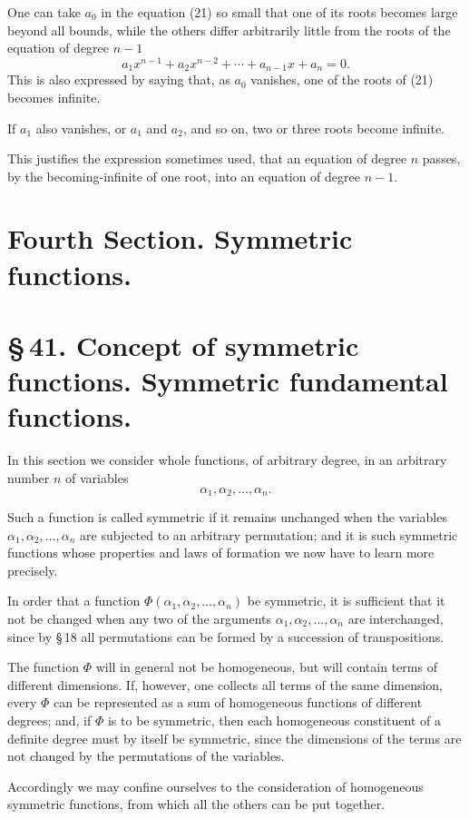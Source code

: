 \documentclass[11pt]{article}
\begin{document}
One can take $a_0$ in the equation (21) so small that one of its roots becomes large beyond all bounds, while the others differ arbitrarily little from the roots of the equation of degree $n-1$
\[
 a_1x^{n-1}+a_2x^{n-2}+\cdots+a_{n-1}x+a_n=0.
\]
This is also expressed by saying that, as $a_0$ vanishes, one of the roots of (21) becomes infinite.

If $a_1$ also vanishes, or $a_1$ and $a_2$, and so on, two or three roots become infinite.

This justifies the expression sometimes used, that an equation of degree $n$ passes, by the becoming-infinite of one root, into an equation of degree $n-1$.

\section*{Fourth Section. Symmetric functions.}

\section*{\S\,41. Concept of symmetric functions. Symmetric fundamental functions.}

In this section we consider whole functions, of arbitrary degree, in an arbitrary number $n$ of variables
\[
 \alpha_1,\alpha_2,\ldots,\alpha_n.
\]

Such a function is called symmetric if it remains unchanged when the variables $\alpha_1,\alpha_2,\ldots,\alpha_n$ are subjected to an arbitrary permutation; and it is such symmetric functions whose properties and laws of formation we now have to learn more precisely.

In order that a function $\Phi(\alpha_1,\alpha_2,\ldots,\alpha_n)$ be symmetric, it is sufficient that it not be changed when any two of the arguments $\alpha_1,\alpha_2,\ldots,\alpha_n$ are interchanged, since by \S\,18 all permutations can be formed by a succession of transpositions.

The function $\Phi$ will in general not be homogeneous, but will contain terms of different dimensions. If, however, one collects all terms of the same dimension, every $\Phi$ can be represented as a sum of homogeneous functions of different degrees; and, if $\Phi$ is to be symmetric, then each homogeneous constituent of a definite degree must by itself be symmetric, since the dimensions of the terms are not changed by the permutations of the variables.

Accordingly we may confine ourselves to the consideration of homogeneous symmetric functions, from which all the others can be put together.
\end{document}
